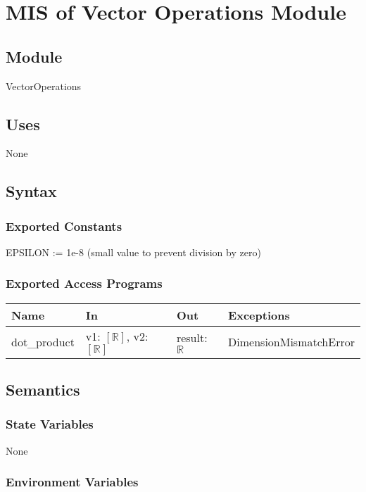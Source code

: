 \documentclass[12pt, titlepage]{article}
\begin{document}
\section{MIS of Vector Operations Module} \label{ModuleVO}

\subsection{Module}

VectorOperations

\subsection{Uses}
None

\subsection{Syntax}

\subsubsection{Exported Constants}
EPSILON := 1e-8 (small value to prevent division by zero)
\subsubsection{Exported Access Programs}

\begin{center}
\begin{tabular}{p{2cm} p{4cm} p{4cm} p{4cm}}
\hline
\textbf{Name} & \textbf{In} & \textbf{Out} & \textbf{Exceptions} \\
\hline
dot\_product & v1: $[\mathbb{R}]$, v2: $[\mathbb{R}]$ & result: $\mathbb{R}$ & DimensionMismatchError \\

\hline
\end{tabular}
\end{center}

\subsection{Semantics}

\subsubsection{State Variables}
None

\subsubsection{Environment Variables}
\end{document}
